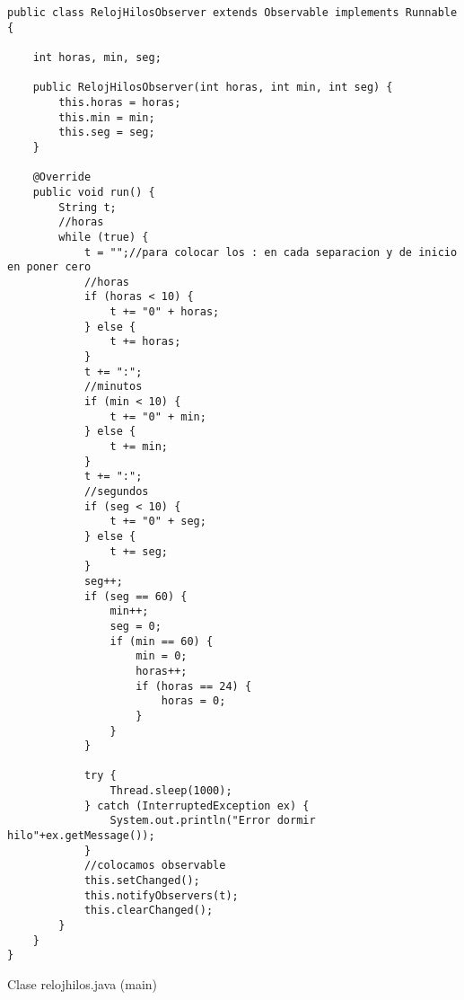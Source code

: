 \begin{verbatim}
public class RelojHilosObserver extends Observable implements Runnable {

    int horas, min, seg;

    public RelojHilosObserver(int horas, int min, int seg) {
        this.horas = horas;
        this.min = min;
        this.seg = seg;
    }

    @Override
    public void run() {
        String t;
        //horas
        while (true) {
            t = "";//para colocar los : en cada separacion y de inicio en poner cero
            //horas
            if (horas < 10) {
                t += "0" + horas;
            } else {
                t += horas;
            }
            t += ":";
            //minutos
            if (min < 10) {
                t += "0" + min;
            } else {
                t += min;
            }
            t += ":";
            //segundos
            if (seg < 10) {
                t += "0" + seg;
            } else {
                t += seg;
            }
            seg++;
            if (seg == 60) {
                min++;
                seg = 0;
                if (min == 60) {
                    min = 0;
                    horas++;
                    if (horas == 24) {
                        horas = 0;
                    }
                }
            }
            
            try {
                Thread.sleep(1000);
            } catch (InterruptedException ex) {
                System.out.println("Error dormir hilo"+ex.getMessage());
            }
            //colocamos observable
            this.setChanged();
            this.notifyObservers(t);
            this.clearChanged();
        }
    }
}
\end{verbatim} \vspace{1cm}

\begin{center}
Clase relojhilos.java (main)
\end{center}

